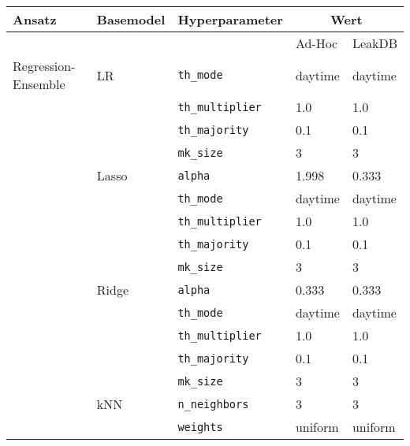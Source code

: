 \begin{table}[h!]
    \footnotesize
    \begin{tabular}{lllll}
    Ansatz              & Basemodel & Hyperparameter                & \multicolumn{2}{c}{Wert} \\ \hline
                        &           &                               & Ad-Hoc      & LeakDB      \\ \cline{4-5}
    Regression-Ensemble & LR        & \texttt{th\_mode}             & daytime     & daytime     \\
                        &           & \texttt{th\_multiplier}       & 1.0         & 1.0         \\
                        &           & \texttt{th\_majority}         & 0.1         & 0.1         \\
                        &           & \texttt{mk\_size}             & 3           & 3           \\
                        & Lasso     & \texttt{alpha}                & 1.998       & 0.333       \\
                        &           & \texttt{th\_mode}             & daytime     & daytime     \\
                        &           & \texttt{th\_multiplier}       & 1.0         & 1.0         \\
                        &           & \texttt{th\_majority}         & 0.1         & 0.1         \\
                        &           & \texttt{mk\_size}             & 3           & 3           \\
                        & Ridge     & \texttt{alpha}                & 0.333       & 0.333       \\
                        &           & \texttt{th\_mode}             & daytime     & daytime     \\
                        &           & \texttt{th\_multiplier}       & 1.0         & 1.0         \\
                        &           & \texttt{th\_majority}         & 0.1         & 0.1         \\
                        &           & \texttt{mk\_size}             & 3           & 3           \\
                        & kNN       & \texttt{n\_neighbors}         & 3           & 3           \\
                        &           & \texttt{weights}              & uniform     & uniform     \\

\end{tabular}
\end{table}
